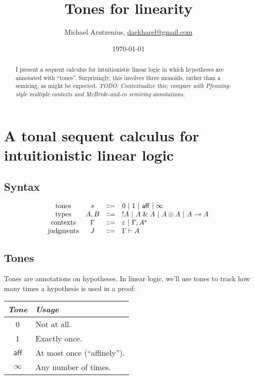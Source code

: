 \documentclass{rntz}
\title{Tones for linearity}
\author{Michael Arntzenius, %
  \href{mailto:daekharel@gmail.com}{daekharel@gmail.com}}
\date{\today}
\newcommand{\todo}[1]{{\itshape\color{blue}#1}}
\newcommand{\bnfeq}{\dblcolon=}
\newcommand{\ms}[1]{\ensuremath{\mathsf{#1}}}
\newcommand{\GG}{\Gamma}
\newcommand{\tone}{1}                    %
\newcommand{\tzero}{0}                   %
\newcommand{\taff}{\ms{aff}}             %
\newcommand{\tmany}{\ensuremath{\infty}} %
\begin{document}
\maketitle

\begin{abstract}
  I present a sequent calculus for intuitionistic linear logic in which
  hypotheses are annotated with ``tones''. Surprisingly, this involves three
  monoids, rather than a semiring, as might be expected. \todo{TODO:
    Contextualize this; compare with Pfenning-style multiple contexts and
    McBride-and-co semiring annotations.}
\end{abstract}

\section{A tonal sequent calculus for intuitionistic linear logic}

\newcommand{\with}{\ensuremath{\mathrel{\&}}}
\newcommand{\ox}{\ensuremath{\otimes}}
\newcommand{\lolli}{\ensuremath{\multimap}}
\newcommand{\bang}{{!}}

\subsection{Syntax}

\[
\begin{array}{cccl}
  \text{tones} & s &\bnfeq& \tzero ~|~ \tone ~|~ \taff ~|~ \tmany
  \\
  \text{types} & A,B &\bnfeq& \bang A ~|~ A \with A ~|~ A \ox A ~|~ A \lolli A
  \\
  \text{contexts} & \GG &\bnfeq& \varepsilon ~|~ \GG, A^s
  \\
  \text{judgments} & J &\bnfeq& \GG \vdash A
\end{array}
\]


\subsection{Tones}

Tones are annotations on hypotheses. In linear logic, we'll use tones to track
how many times a hypothesis is used in a proof:

\begin{center}
  \begin{tabular}{cl}
    \textit{Tone} & \textit{Usage}\\\midrule
    \tzero & Not at all.\\
    \tone  & Exactly once.\\
    \taff  & At most once (``affinely'').\\
    \tmany & Any number of times.
  \end{tabular}
\end{center}
\end{document}
